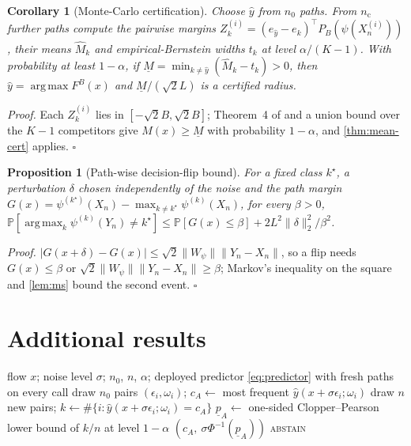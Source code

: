 \documentclass{article}
\newtheorem{proposition}{Proposition}
\newtheorem{corollary}{Corollary}
\theoremstyle{definition}
\newcommand{\Prob}{\mathbb{P}}
\newcommand{\tr}{\top}
\DeclareMathOperator*{\argmax}{arg\,max}
\begin{document}
\begin{corollary}[Monte-Carlo certification]\label{cor:mc}
Choose $\hat y$ from $n_0$ paths. From $n_{\mathrm c}$ further paths compute the
pairwise margins $Z^{(i)}_k=(e_{\hat y}-e_k)^\tr P_B(\psi(X^{(i)}_n))$, their
means $\hat M_k$ and empirical-Bernstein widths $t_k$ \citep{maurer2009bernstein}
at level $\alpha/(K-1)$. With probability at least $1-\alpha$, if
$\underline M=\min_{k\ne\hat y}(\hat M_k-t_k)>0$, then $\hat y=\argmax F^B(x)$ and
$\underline M/(\sqrt2L)$ is a certified radius.
\end{corollary}
\emph{Proof.} Each $Z^{(i)}_k$ lies in $[-\sqrt2B,\sqrt2B]$; Theorem~4 of
\citet{maurer2009bernstein} and a union bound over the $K-1$ competitors give
$M(x)\ge\underline M$ with probability $1-\alpha$, and \cref{thm:mean-cert}
applies. \hfill$\square$

\begin{proposition}[Path-wise decision-flip bound]\label{prop:flip}
For a fixed class $k^\star$, a perturbation $\delta$ chosen independently of the
noise and the path margin $G(x)=\psi^{(k^\star)}(X_n)-\max_{k\ne k^\star}\psi^{(k)}(X_n)$,
for every $\beta>0$,
$\Prob[\argmax_k\psi^{(k)}(Y_n)\ne k^\star]\le\Prob[G(x)\le\beta]+2L^2\|\delta\|_2^2/\beta^2$.
\end{proposition}
\emph{Proof.} $|G(x+\delta)-G(x)|\le\sqrt2\|W_\psi\|\|Y_n-X_n\|$, so a flip needs
$G(x)\le\beta$ or $\sqrt2\|W_\psi\|\|Y_n-X_n\|\ge\beta$; Markov's inequality on the
square and \cref{lem:ms} bound the second event. \hfill$\square$



\section{Additional results}\label{app:tables}
\begin{algorithm}[h]
\caption{\textsc{CertifySmoothed}$(x)$ for the stochastic detector}
\label{alg:certify}
\begin{algorithmic}[1]
\REQUIRE flow $x$; noise level $\sigma$; $n_0$, $n$, $\alpha$; deployed predictor \eqref{eq:predictor} with fresh paths on every call
\STATE draw $n_0$ pairs $(\epsilon_i,\omega_i)$; $c_A\leftarrow$ most frequent $\hat y(x+\sigma\epsilon_i;\omega_i)$ \hfill{}
\STATE draw $n$ new pairs; $k\leftarrow\#\{i:\hat y(x+\sigma\epsilon_i;\omega_i)=c_A\}$ \hfill{}
\STATE $\underline p_A\leftarrow$ one-sided Clopper--Pearson lower bound of $k/n$ at level $1-\alpha$
 \RETURN $(c_A,\ \sigma\Phi^{-1}(\underline p_A))$ \ELSE \RETURN \textsc{abstain} \ENDIF
\end{algorithmic}
\end{algorithm}
\end{document}
